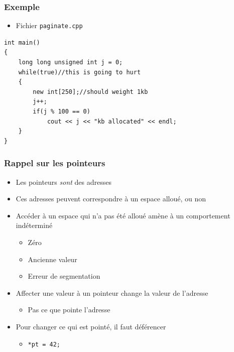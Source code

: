 \begin{frame}[containsverbatim]
\frametitle{Exemple}
\begin{itemize}
\item Fichier \texttt{paginate.cpp}
\end{itemize}
\begin{lstlisting}
int main()
{		
	long long unsigned int j = 0;
	while(true)//this is going to hurt
	{
		new int[250];//should weight 1kb
		j++;
		if(j % 100 == 0)
			cout << j << "kb allocated" << endl;		
	}
}	
\end{lstlisting}
\end{frame}

\begin{frame}
\frametitle{Rappel sur les pointeurs}
\begin{itemize}[<+->]
\item Les pointeurs \emph{sont} des adresses
\item Ces adresses peuvent correspondre à un espace alloué, ou non
\item Accéder à un espace qui n'a pas été alloué amène à un comportement indéterminé
	\begin{itemize}
	\item Zéro
	\item Ancienne valeur
	\item Erreur de segmentation
	\end{itemize}
\item Affecter une valeur à un pointeur change la valeur de l'adresse
	\begin{itemize}
	\item Pas ce que pointe l'adresse
	\end{itemize}
\item Pour changer ce qui est pointé, il faut déférencer 
	\begin{itemize}
	\item \texttt{*pt = 42;}
	\end{itemize}
\end{itemize}
\end{frame}


